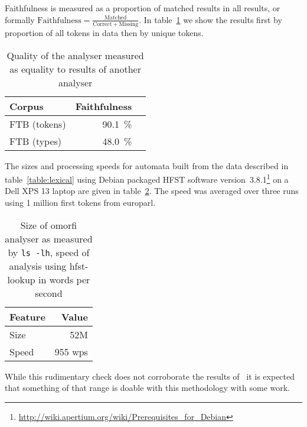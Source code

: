 \documentclass[a4paper,12pt]{article}
\begin{document}
Faithfulness is measured as a proportion of matched results in all results, or
formally $\mathrm{Faithfulness} = \frac{\mathrm{Matched}}{\mathrm{Correct} +
\mathrm{Missing}}$. In table~\ref{table:quality} we show the results first
by proportion of all tokens in data then by unique tokens.

\begin{table}
    \begin{scriptsize}
    \centering
    \begin{tabular}{|l|r|r|}
        \hline
        \bf Corpus & \bf Faithfulness \\
        \hline
        FTB (tokens) & 90.1~\% \\
        FTB (types)  & 48.0~\% \\
        \hline
    \end{tabular}
    \caption{Quality of the analyser measured as equality to results of
        another analyser \label{table:quality}}
  \end{scriptsize}
\end{table}

The sizes and processing speeds for automata built from the data described in
table~\ref{table:lexical} using Debian packaged HFST software
version~3.8.1\footnote{\url{http://wiki.apertium.org/wiki/Prerequisites_for_Debian}}
on a Dell XPS 13 laptop are given in table~\ref{table:size-speed}. The speed
was averaged over three runs using 1 million first tokens from europarl.

\begin{table}
    \begin{scriptsize}
        \centering
        \begin{tabular}{|l|r|}
            \hline
            \bf Feature & \bf Value \\
            \hline
            Size & 52M \\
            Speed & 955 wps\\
            \hline
        \end{tabular}
        \caption{Size of omorfi analyser as measured by \texttt{ls -lh}, speed
        of analysis using hfst-lookup in words per second \label{table:size-speed}}
    \end{scriptsize}
\end{table}

While this rudimentary check does not corroborate the results
of~\citet{silfverberg2009hfst} it is expected that something of that range is
doable with this methodology with some work.
\end{document}
